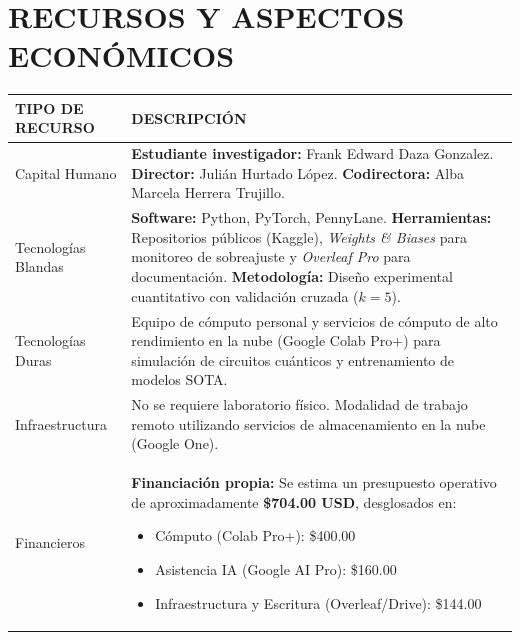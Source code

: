 \documentclass[12pt,letterpaper]{article}
\begin{document}
    \newpage
    \section{RECURSOS Y ASPECTOS ECONÓMICOS}
    \vspace{-0.5cm}
    
    \begin{tabularx}{\textwidth}{|p{}|X|}
        \hline
        \rowcolor{lightgray} \textbf{TIPO DE RECURSO} & \textbf{DESCRIPCIÓN} \\
        \hline
        Capital Humano & \textbf{Estudiante investigador:} Frank Edward Daza Gonzalez. \newline
        \textbf{Director:} Julián Hurtado López. \newline
        \textbf{Codirectora:} Alba Marcela Herrera Trujillo. \\
        \hline
        Tecnologías Blandas & \textbf{Software:} Python, PyTorch, PennyLane. \newline
        \textbf{Herramientas:} Repositorios públicos (Kaggle), \textit{Weights \& Biases} para monitoreo de sobreajuste y \textit{Overleaf Pro} para documentación. \newline
        \textbf{Metodología:} Diseño experimental cuantitativo con validación cruzada ($k=5$). \\
        \hline
        Tecnologías Duras & Equipo de cómputo personal y servicios de cómputo de alto rendimiento en la nube (Google Colab Pro+) para simulación de circuitos cuánticos y entrenamiento de modelos SOTA. \\
        \hline
        Infraestructura & No se requiere laboratorio físico. Modalidad de trabajo remoto utilizando servicios de almacenamiento en la nube (Google One). \\
        \hline
        Financieros & \textbf{Financiación propia:} Se estima un presupuesto operativo de aproximadamente \textbf{\$704.00 USD}, desglosados en:
        \begin{itemize}
            \item Cómputo (Colab Pro+): \$400.00
            \item Asistencia IA (Google AI Pro): \$160.00
            \item Infraestructura y Escritura (Overleaf/Drive): \$144.00
        \end{itemize} \\
        \hline
    \end{tabularx}

    \newpage
    \renewcommand{\refname}{REFERENCIAS}
    
    
\end{document}
